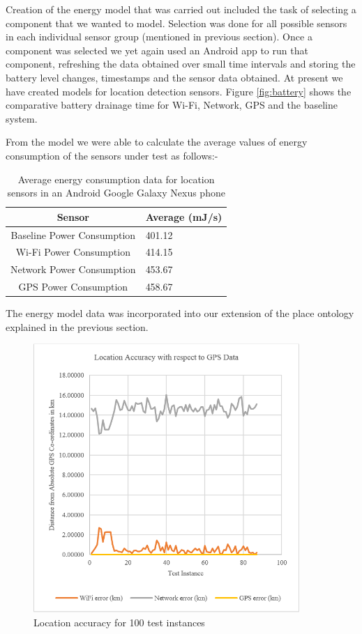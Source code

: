 \documentclass{ubicomp2013}
\begin{document}
Creation of the energy model that was carried out included the task of selecting a component that we wanted to model. Selection was done for all possible sensors in each individual sensor group (mentioned in previous section). Once a component was selected we yet again used an Android app to run that component, refreshing the data obtained over small time intervals and storing the battery level changes, timestamps and the sensor data obtained. At present we have created models for location detection sensors. Figure \ref{fig:battery} shows the comparative battery drainage time for Wi-Fi, Network, GPS and the baseline system.
  
From the model we were able to calculate the average values of energy consumption of the sensors under test as follows:-
\begin{table}
\centering
\caption{Average energy consumption data for location sensors in an Android Google Galaxy Nexus phone}

\begin{tabular}{|c|l|} \hline
Sensor&Average (mJ/s)\\ \hline
Baseline Power Consumption&401.12\\ \hline
Wi-Fi Power Consumption&414.15\\ \hline
Network Power Consumption&453.67\\ \hline
GPS Power Consumption&458.67\\ \hline
\hline\end{tabular}
\end{table}

The energy model data was incorporated into our extension of the place ontology explained in the previous section.

\begin{figure}[tbh]
\centering
\includegraphics[width=0.9\textwidth]{Accuracy.png}
\caption{Location accuracy for 100 test instances}
\label{fig:accuracy}
\end{figure}
\end{document}
